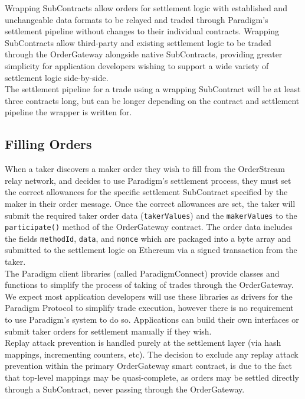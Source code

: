 \documentclass[9pt]{article}
\begin{document}
\noindent Wrapping SubContracts allow orders for settlement logic with established and unchangeable data formats to be relayed and traded through Paradigm’s settlement pipeline without changes to their individual contracts. Wrapping SubContracts allow third-party and existing settlement logic to be traded through the OrderGateway alongside native SubContracts, providing greater simplicity for application developers wishing to support a wide variety of settlement logic side-by-side. \\

\noindent The settlement pipeline for a trade using a wrapping SubContract will be at least three contracts long, but can be longer depending on the contract and settlement pipeline the wrapper is written for.

\subsection{Filling Orders}
\noindent When a taker discovers a maker order they wish to fill from the OrderStream relay network, and decides to use Paradigm’s settlement process, they must set the correct allowances for the specific settlement SubContract specified by the maker in their order message. Once the correct allowances are set, the taker will submit the required taker order data (\texttt{takerValues}) and the \texttt{makerValues} to the \texttt{participate()} method of the OrderGateway contract. The order data includes the fields \texttt{methodId}, \texttt{data}, and \texttt{nonce} which are packaged into a byte array and submitted to the settlement logic on Ethereum via a signed transaction from the taker. \\

\noindent The Paradigm client libraries (called ParadigmConnect) provide classes and functions to simplify the process of taking of trades through the OrderGateway. We expect most application developers will use these libraries as drivers for the Paradigm Protocol to simplify trade execution, however there is no requirement to use Paradigm’s system to do so. Applications can build their own interfaces or submit taker orders for settlement manually if they wish. \\

\noindent Replay attack prevention is handled purely at the settlement layer (via hash mappings, incrementing counters, etc). The decision to exclude any replay attack prevention within the primary OrderGateway smart contract, is due to the fact that top-level mappings may be quasi-complete, as orders may be settled directly through a SubContract, never passing through the OrderGateway.
\end{document}

